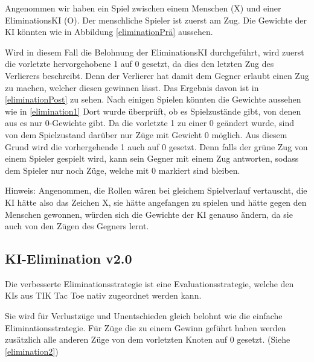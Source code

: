 \documentclass[titlepage]{scrartcl}
\newcommand{\TicTacToe}{TI\reflectbox K Tac Toe}
\begin{document}
Angenommen wir haben ein Spiel zwischen einem Menschen (X) und einer EliminationsKI (O).
Der menschliche Spieler ist zuerst am Zug.
Die Gewichte der KI könnten wie in Abbildung \ref{eliminationPrä} aussehen.

Wird in diesem Fall die Belohnung der EliminationsKI durchgeführt, wird zuerst die vorletzte hervorgehobene 1 auf 0 gesetzt, da dies den letzten Zug des Verlierers beschreibt.
Denn der Verlierer hat damit dem Gegner erlaubt einen Zug zu machen, welcher diesen gewinnen lässt.
Das Ergebnis davon ist in \ref{eliminationPost} zu sehen.
Nach einigen Spielen könnten die Gewichte aussehen wie in \ref{elimination1}
Dort wurde überprüft, ob es Spielzustände gibt, von denen aus es nur 0-Gewichte gibt. Da die vorletzte 1 zu einer 0 geändert wurde, sind von dem Spielzustand darüber nur Züge mit Gewicht 0 möglich. Aus diesem Grund wird die vorhergehende 1 auch auf 0 gesetzt. Denn falls der grüne Zug von einem Spieler gespielt wird, kann sein Gegner mit einem Zug antworten, sodass dem Spieler nur noch Züge, welche mit 0 markiert sind bleiben.

Hinweis: Angenommen, die Rollen wären bei gleichem Spielverlauf vertauscht, die KI hätte also das Zeichen X, sie hätte angefangen zu spielen und hätte gegen den Menschen gewonnen, würden sich die Gewichte der KI genauso ändern, da sie auch von den Zügen des Gegners lernt.
\pagebreak

\subsection{KI-Elimination v2.0}
Die verbesserte Eliminationsstrategie ist eine Evaluationsstrategie, welche den KIs aus \TicTacToe{} nativ zugeordnet werden kann.

Sie wird für Verlustzüge und Unentschieden gleich belohnt wie die einfache Eliminationsstrategie.
Für Züge die zu einem Gewinn geführt haben werden zusätzlich alle anderen Züge von dem vorletzten Knoten auf 0 gesetzt. (Siehe \ref{elimination2})
\end{document}
